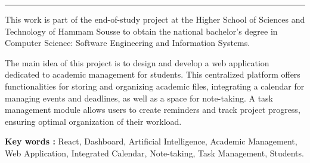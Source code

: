 \hrule
\vspace{1cm}
This work is part of the end-of-study project at the Higher School of Sciences and Technology of Hammam Sousse to obtain the national bachelor's degree in Computer Science: Software Engineering and Information Systems.
\par \vspace{5mm}
The main idea of this project is to design and develop a web application dedicated to academic management for students. This centralized platform offers functionalities for storing and organizing academic files, integrating a calendar for managing events and deadlines, as well as a space for note-taking. A task management module allows users to create reminders and track project progress, ensuring optimal organization of their workload.
\par \vspace{5mm}
\textbf{Key words : } React, Dashboard, Artificial Intelligence, Academic Management, Web Application, Integrated Calendar, Note-taking, Task Management, Students.
\vspace*{\fill}























